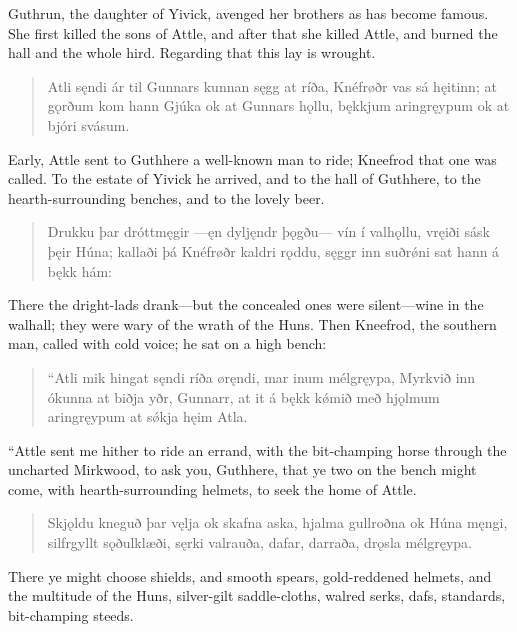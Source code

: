 \bookStart

Guthrun, the daughter of Yivick, avenged her brothers as has become famous. She first killed the sons of Attle, and after that she killed Attle, and burned the hall and the whole hird. Regarding that this lay is wrought.

\begin{verse}
\bva Atli sęndi \hld ár til Gunnars
kunnan sęgg at ríða, \hld Knéfrøðr vas sá hęitinn;
at gǫrðum kom hann Gjúka \hld ok at Gunnars hǫllu,
bękkjum aringręypum \hld ok at bjóri svásum. 
\end{verse}

\bvb Early, Attle sent to Guthhere a well-known man to ride; Kneefrod that one was called. To the estate of Yivick he arrived, and to the hall of Guthhere, to the hearth-surrounding benches, and to the lovely beer.

\begin{verse}
\bva Drukku þar dróttmęgir \hld —ęn dyljęndr þǫgðu—
vín í valhǫllu, \hld vręiði sásk þęir Húna;
kallaði þá Knéfrøðr \hld kaldri rǫddu,
sęggr inn suðrǿni \hld sat hann á bękk hám: 
\end{verse}

\bvb There the dright-lads drank—but the concealed ones were silent—wine in the walhall; they were wary of the wrath of the Huns. Then Kneefrod, the southern man, called with cold voice; he sat on a high bench:

\begin{verse}
\bva “Atli mik hingat sęndi \hld ríða øręndi,
mar inum mélgręypa, \hld Myrkvið inn ókunna
at biðja yðr, Gunnarr, \hld at it á bękk kǿmið
með hjǫlmum aringręypum \hld at sǿkja hęim Atla. 
\end{verse}

\bvb “Attle sent me hither to ride an errand, with the bit-champing horse through the uncharted Mirkwood, to ask you, Guthhere, that ye two on the bench might come, with hearth-surrounding helmets, to seek the home of Attle.

\begin{verse}
\bva Skjǫldu kneguð þar vęlja \hld ok skafna aska,
hjalma gullroðna \hld ok Húna męngi,
silfrgyllt sǫðulklæði, \hld sęrki valrauða,
dafar, darraða, \hld drǫsla mélgręypa. 
\end{verse}

\bvb There ye might choose shields, and smooth spears, gold-reddened helmets, and the multitude of the Huns, silver-gilt saddle-cloths, walred serks, dafs, standards, bit-champing steeds.

